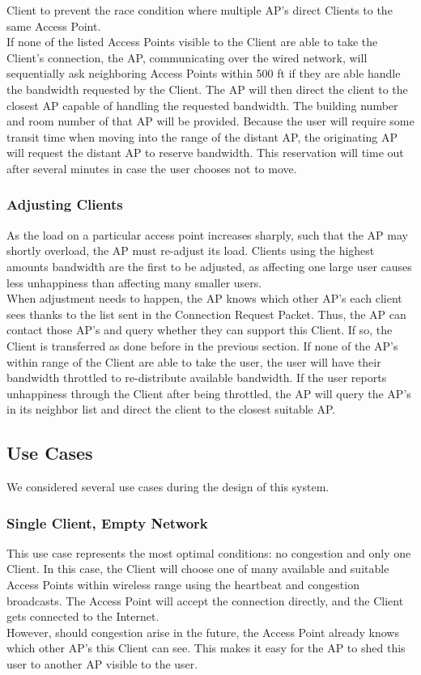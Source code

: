 \documentclass[11pt,twocolumn]{article}
\begin{document}
Client to prevent the race condition where multiple AP's direct Clients to the same Access Point.\\
\indent
If none of the listed Access Points visible to the Client are able to take the Client's connection, the AP, communicating over the wired network, will 
sequentially ask neighboring Access Points within 500 ft if they are able handle the bandwidth requested by the Client. The AP will then direct the client to the closest AP 
capable of handling the requested bandwidth. The building number and room number of that AP will be provided. Because the user will require some transit time when moving into the range 
of the distant AP, the originating AP will request the distant AP to reserve bandwidth. This reservation will time out after several minutes in case the user
chooses not to move. \\

\subsubsection{Adjusting Clients}
\indent
As the load on a particular access point increases sharply, such that the AP may shortly overload, the AP must re-adjust its load. Clients using the highest amounts 
bandwidth are the first to be adjusted, as affecting one large user causes less unhappiness than affecting many smaller users. \\
\indent
When adjustment needs to happen, the AP knows which other AP's each client sees thanks to the list sent in the Connection 
Request Packet. Thus, the AP can contact those AP's and query whether they can support this Client. If so, the 
Client is transferred as done before in the previous section. If none of the AP's within range of the Client 
are able to take the user, the user will have their bandwidth throttled to re-distribute available bandwidth. If the user 
reports unhappiness through the Client after being throttled, the AP will query the AP's in its neighbor list and direct 
the client to the closest suitable AP.

\subsection{Use Cases}
We considered several use cases during the design of this system.
\subsubsection{Single Client, Empty Network}
\indent This use case represents the most optimal conditions: no congestion and only one Client. In this case, the Client will choose one of many available 
and suitable Access Points within wireless range using the heartbeat and congestion broadcasts. The Access Point will accept the connection directly, and the 
Client gets connected to the Internet.\\
\indent However, should congestion arise in the future, the Access Point already knows which other AP's this Client can see. This makes it easy for the AP to
shed this user to another AP visible to the user.
\end{document}
